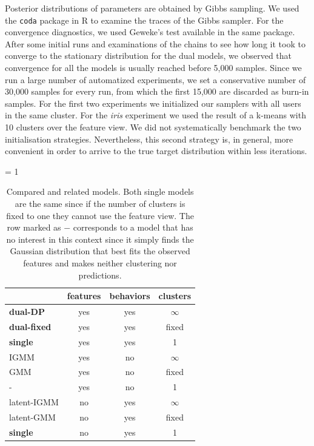 \documentclass[smallextended]{svjour3}          %
\begin{document}
Posterior distributions of parameters are obtained by Gibbs sampling. We used the \texttt{coda} package \citep{coda, coda2015} in R \citep{R} to examine the traces of the Gibbs sampler. For the convergence diagnostics, we used Geweke's test available in the same package. After some initial runs and examinations of the chains to see how long it took to converge to the stationary distribution for the dual models, we observed that convergence for all the models is usually reached before 5,000 samples. Since we run a large number of automatized experiments, we set a conservative number of 30,000 samples for every run, from which the first 15,000 are discarded as burn-in samples. 
For the first two experiments we initialized our samplers with all users in the same cluster. For the \textit{iris} experiment we used the result of a k-means with 10 clusters over the feature view. We did not systematically benchmark the two initialisation strategies. Nevertheless, this second strategy is, in general, more convenient in order to arrive to the true target distribution within less iterations.
\begin{table}[ht]
\caption{Compared and related models. Both single models are the same since if the number of clusters is fixed to one they cannot use the feature view. The row marked as $-$ corresponds to a model that has no interest in this context since it simply finds the Gaussian distribution that best fits the observed features and makes neither clustering nor predictions.} 
 \begin{center}
   \tabcolsep = 1\tabcolsep
   \begin{tabular}{lccc}
   \hline\hline
                & features & behaviors & clusters\\
   \hline
   \textbf{dual-DP}    & yes & yes   & $\infty$\\
   \textbf{dual-fixed} & yes & yes   & fixed   \\
   \textbf{single}     & yes & yes   & 1 \\
   IGMM     & yes & no    & $\infty$ \\
   GMM        & yes & no    & fixed \\
   -          & yes & no    & 1 \\
   latent-IGMM & no  & yes   & $\infty$ \\
   latent-GMM    & no  & yes   & fixed \\
   \textbf{single}     & no  & yes   & 1 \\   
   \hline
   \end{tabular}
\label{tab:models}
 \end{center}
\end{table}
\end{document}
